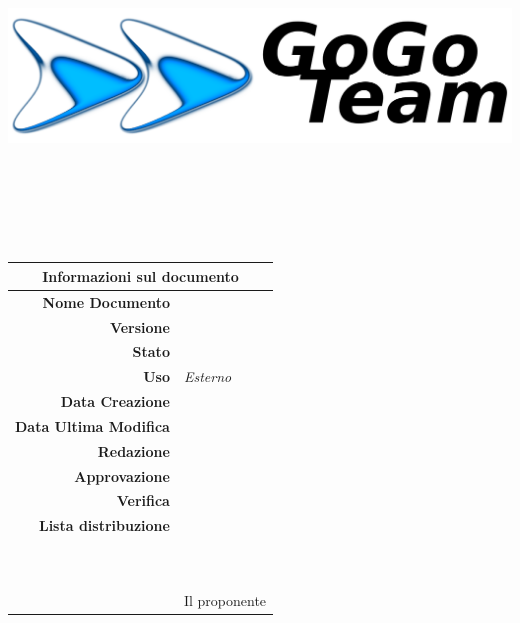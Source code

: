 \thispagestyle{empty}

\begin{titlepage}

\begin{center}
	\dataUM \\
	\vspace{1cm}
	\begin{Huge}
		\textbf{\ggt}
	\end{Huge}
	
	\vspace{2cm}
	
	\includegraphics[scale=0.75]{../imgs/gogoTeamLogo.png}
	
	\vspace{2cm}
	
\HRule \\[0.4cm]
	\begin{Huge}
		{\huge \bfseries \titoloDocumento}\\[0.4cm]
	\end{Huge}
\HRule \\[2.5cm]
	
	\vfill

\begin{table}[h]
\begin{center}
\begin{tabular}{r | l}
\multicolumn{2}{c}{\textbf{Informazioni sul documento}}\\
\midrule
\textbf{Nome Documento}	&	\titoloDocumento	\\
\textbf{Versione}	&	\versione	\\
\textbf{Stato}	&	\emph{\stato}	\\
\textbf{Uso}	&	\emph{Esterno}	\\
\textbf{Data Creazione}	&	\dataCreazione	\\
\textbf{Data Ultima Modifica}	&	\dataUM	\\
\textbf{Redazione}	& \FZ\\
\textbf{Approvazione}	&	\AB\	\\
\textbf{Verifica}	&	\EZ	\\
\textbf{Lista distribuzione}	&	\ggt 	\\
\ 	&	\Vardanega	\\
\ 	&	\Cardin	\\
\ 	&	Il proponente \Zucchetti	\\

\end{tabular}
\end{center}
\end{table}

\end{center}

\end{titlepage}